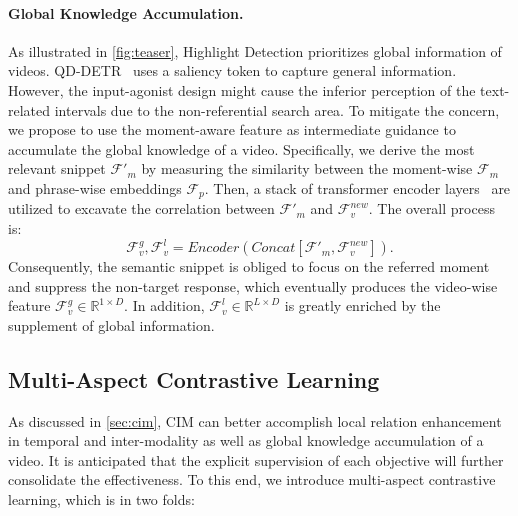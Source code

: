\documentclass[10pt,twocolumn,letterpaper]{article}
\begin{document}
\vspace{-10pt}
\paragraph{Global Knowledge Accumulation.}
As illustrated in \cref{fig:teaser}, Highlight Detection prioritizes global information of videos.
QD-DETR~\cite{qddetr} uses a saliency token to capture general information. 
However, the input-agonist design might cause the inferior perception of the text-related intervals due to the non-referential search area.
To mitigate the concern, we propose to use the moment-aware feature as intermediate guidance to accumulate the global knowledge of a video.  
Specifically, we derive the most relevant snippet $\mathcal{F'}_m$ by measuring the similarity between the moment-wise $\mathcal{F}_m $ and phrase-wise embeddings $\mathcal{F}_p$. Then, a stack of transformer encoder layers~\cite{transformer} are utilized to excavate the correlation between $\mathcal{F'}_m$ and $\mathcal{F}_v^{new}$. The overall process is:
\begin{equation}
    \mathcal{F}_v^{g}, \mathcal{F}_v^{l} = Encoder(Concat[ \mathcal{F'}_m,\mathcal{F}_v^{new}]).
\end{equation}
Consequently, the semantic snippet is obliged to focus on the referred moment and suppress the non-target response, which eventually produces the video-wise feature $\mathcal{F}_v^{g} \in \mathbb{R}^{1\times D}$. In addition, $\mathcal{F}_v^{l} \in \mathbb{R}^{L\times D}$ is greatly enriched by the supplement of global information.  

\subsection{Multi-Aspect Contrastive Learning}
\label{sec:MACL}
As discussed in \cref{sec:cim}, CIM can better accomplish local relation enhancement in temporal and inter-modality as well as global knowledge accumulation of a video. It is anticipated that the explicit supervision of each objective will further consolidate the effectiveness. To this end, we introduce multi-aspect contrastive learning, which is in two folds:  
\end{document}
